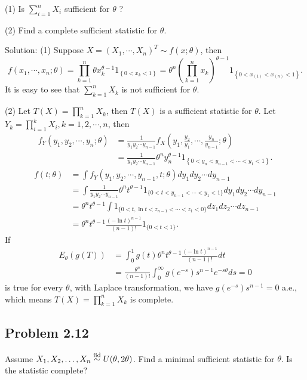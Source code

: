 (1) Is $\sum_{i=1}^{n}X_{i}$ sufficient for $\theta$ ?

(2) Find a complete sufficient statistic for $\theta$.

{Solution:}
(1) Suppose $X=(X_{1},\cdots,X_{n})^{T}\sim f(x;\theta)$, then
\[
f(x_{1},\cdots,x_{n};\theta)=\prod_{k=1}^{n}\theta x_{k}^{\theta-1}1_{\left\{0<x_{k}<1\right\}}=\theta^{n}\left(\prod_{k=1}^{n}x_{k}\right)^{\theta-1}1_{\left\{0<x_{(1)}<x_{(n)}<1\right\}}.
\]
It is easy to see that $\sum_{k=1}^{n}X_{k}$ is not sufficient for $\theta$.

(2) Let $T(X)=\prod_{k=1}^{n}X_{k}$, then $T(X)$ is a sufficient statistic for $\theta$. Let $Y_{k}=\prod_{i=1}^{k}X_{i},k=1,2,\cdots,n$, then
\begin{align*}
f_{Y}(y_{1},y_{2},\cdots,y_{n};\theta)&=\frac{1}{y_{1}y_{2}\cdots y_{n-1}}f_{X}\left(y_{1},\frac{y_{2}}{y_{1}},\cdots,\frac{y_{n}}{y_{n-1}};\theta\right)\\
&=\frac{1}{y_{1}y_{2}\cdots y_{n-1}}\theta^{n}y_{n}^{\theta-1}1_{\left\{0<y_{n}<y_{n-1}<\cdots<y_{1}<1\right\}}.
\end{align*}
\begin{align*}
f(t;\theta)&=\int f_{Y}\left(y_{1},y_{2},\cdots,y_{n-1},t;\theta\right)dy_{1}dy_{2}\cdots dy_{n-1}\\
&=\int\frac{1}{y_{1}y_{2}\cdots y_{n-1}}\theta^{n}t^{\theta-1}1_{\{0<t<y_{n-1}<\cdots<y_{1}<1\}}dy_{1}dy_{2}\cdots dy_{n-1}\\
&=\theta^{n}t^{\theta-1}\int 1_{\{0<t,\ln t<z_{n-1}<\cdots<z_{1}<0\}}dz_{1}dz_{2}\cdots dz_{n-1}\\
&=\theta^{n}t^{\theta-1}\frac{(-\ln t)^{n-1}}{(n-1)!}1_{\{0<t<1\}}.
\end{align*}
If
\begin{align*}
E_{\theta}(g(T))&=\int_{0}^{1}g(t)\theta^{n}t^{\theta-1}\frac{(-\ln t)^{n-1}}{(n-1)!}dt\\
&=\frac{\theta^{n}}{(n-1)!}\int_{0}^{\infty}g\left(e^{-s}\right)s^{n-1}e^{-s\theta}ds=0
\end{align*}
is true for every $\theta$, with Laplace transformation, we have $g(e^{-s})s^{n-1}=0$ a.e., which means $T(X)=\prod_{k=1}^{n}X_{k}$ is complete.

\subsection*{Problem 2.12}
Assume $X_{1},X_{2},\ldots,X_{n}\stackrel{\rm iid}{\sim}U(\theta,2\theta)$. Find a minimal sufficient statistic for $\theta$. Is the statistic complete?

